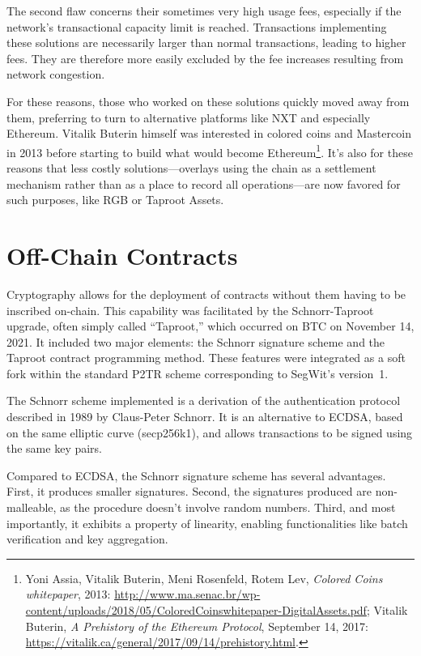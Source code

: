 \documentclass[
  a5paper,
  smalldemyvopaper,10pt,twoside,onecolumn,openright,extrafontsizes,hidelinks]{memoir}
\begin{document}
The second flaw concerns their sometimes very high usage fees,
especially if the network's transactional capacity limit is reached.
Transactions implementing these solutions are necessarily larger than
normal transactions, leading to higher fees. They are therefore more
easily excluded by the fee increases resulting from network congestion.

For these reasons, those who worked on these solutions quickly moved
away from them, preferring to turn to alternative platforms like NXT and
especially Ethereum. Vitalik Buterin himself was interested in colored
coins and Mastercoin in 2013 before starting to build what would become
Ethereum\footnote{Yoni Assia, Vitalik Buterin, Meni Rosenfeld, Rotem
  Lev, \emph{Colored Coins whitepaper}, 2013:
  \url{http://www.ma.senac.br/wp-content/uploads/2018/05/ColoredCoinswhitepaper-DigitalAssets.pdf};
  Vitalik Buterin, \emph{A Prehistory of the Ethereum Protocol},
  September 14, 2017:
  \url{https://vitalik.ca/general/2017/09/14/prehistory.html}.}. It's
also for these reasons that less costly solutions---overlays using the
chain as a settlement mechanism rather than as a place to record all
operations---are now favored for such purposes, like RGB or Taproot
Assets.

\section*{Off-Chain Contracts}\label{off-chain-contracts}


Cryptography allows for the deployment of contracts without them having
to be inscribed on-chain. This capability was facilitated by the
Schnorr-Taproot upgrade, often simply called ``Taproot,'' which occurred
on BTC on November 14, 2021. It included two major elements: the Schnorr
signature scheme and the Taproot contract programming method. These
features were integrated as a soft fork within the standard P2TR scheme
corresponding to SegWit's version~1.

The Schnorr scheme implemented is a derivation of the authentication
protocol described in 1989 by Claus-Peter Schnorr. It is an alternative
to ECDSA, based on the same elliptic curve (secp256k1), and allows
transactions to be signed using the same key pairs.

Compared to ECDSA, the Schnorr signature scheme has several advantages.
First, it produces smaller signatures. Second, the signatures produced
are non-malleable, as the procedure doesn't involve random numbers.
Third, and most importantly, it exhibits a property of linearity,
enabling functionalities like batch verification and key aggregation.
\end{document}
